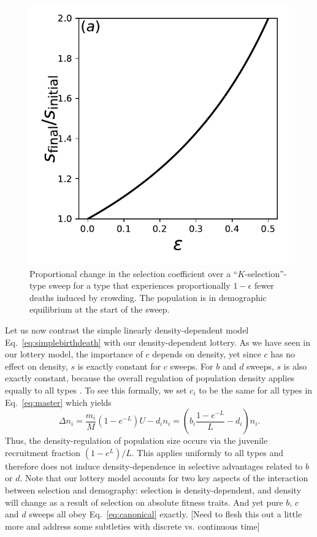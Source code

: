 \documentclass[11pt]{article}
\begin{document}
\begin{figure}
\centering
\includegraphics[scale=0.8]{strengthofselection.pdf}
\caption{\label{fig:strengthofselection} Proportional change in the selection coefficient over a ``$K$-selection''-type sweep for a type that experiences proportionally $1-\epsilon$ fewer deaths induced by crowding. The population is in demographic equilibrium at the start of the sweep.}
\end{figure}

Let us now contrast the simple linearly density-dependent model Eq.~\eqref{eq:simplebirthdeath} with our density-dependent lottery. As we have seen in our lottery model, the importance of $c$ depends on density, yet since $c$ has no effect on density, $s$ is exactly constant for $c$ sweeps. For $b$ and $d$ sweeps, $s$ is also exactly constant, because the overall regulation of population density applies equally to all types \citep{prout_1980}. To see this formally, we set $c_i$ to be the same for all types in Eq.~\eqref{eq:master} which yields
\begin{equation}
\Delta n_i = \frac{m_i}{M}(1-e^{-L})U-d_i n_i = \left(b_i\frac{1-e^{-L}}{L}-d_i \right) n_i.
\end{equation}
Thus, the density-regulation of population size occurs via the juvenile recruitment fraction $(1-e^{L})/L$. This applies uniformly to all types and therefore does not induce density-dependence in selective advantages related to $b$ or $d$. Note that our lottery model accounts for two key aspects of the interaction between selection and demography: selection is density-dependent, and density will change as a result of selection on absolute fitness traits. And yet pure $b$, $c$ and $d$ sweeps all obey Eq.~\eqref{eq:canonical} exactly. [Need to flesh this out a little more and address some subtleties with discrete vs. continuous time]
\end{document}
